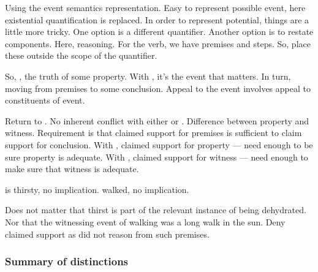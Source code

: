 \begin{note}[More on \WR{}]
  \color{red}
  Using the event semantics representation.
  Easy to represent possible event, here existential quantification is replaced.
  In order to represent potential, things are a little more tricky.
  One option is a different quantifier.
  Another option is to restate components.
  Here, reasoning.
  For the verb, we have premises and steps.
  So, place these outside the scope of the quantifier.
\end{note}

\begin{note}[Why]
  So, \AR{}, the truth of some property.
  With \WR{}, it's the event that matters.
  In turn, moving from premises to some conclusion.
  Appeal to the event involves appeal to constituents of event.

  Return to \ESU{}.
  No inherent conflict with either \AR{} or \WR{}.
  Difference between property and witness.
  Requirement is that claimed support for premises is sufficient to claim support for conclusion.
  With \AR{}, claimed support for property --- need enough to be sure property is adequate.
  With \WR{}, claimed support for witness --- need enough to make sure that witness is adequate.

   is thirsty, no implication.
   walked, no implication.

  Does not matter that thirst is part of the relevant instance of being dehydrated.
  Nor that the witnessing event of walking was a long walk in the sun.
  Deny claimed support as did not reason from such premises.
\end{note}

\subsubsection{Summary of distinctions}
\label{sec:summary-distinctions}


